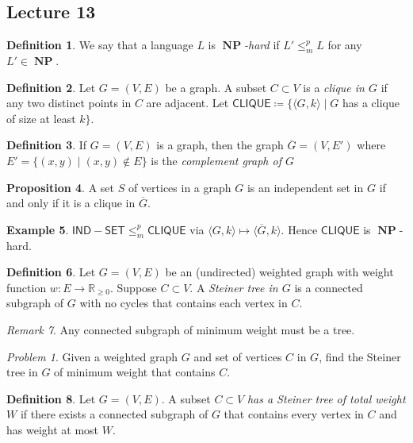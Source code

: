 \documentclass[10pt,letterpaper,cm]{nupset}
\theoremstyle{definition}
\newtheorem{definition}{Definition}[subsection]
\newtheorem{exmp}[definition]{Example}
\theoremstyle{theorem}
\newtheorem{prop}[definition]{Proposition}
\theoremstyle{remark}
\newtheorem{remark}[definition]{Remark}
\newtheorem*{prob}{Problem}
\newcommand{\R}{\mathbb R}
\newcommand{\1}{\mathbf{1}}
\newcommand{\0}{\vec 0}
\DeclareMathOperator{\NP}{\mathbf{NP}}
\begin{document}
\subsection{Lecture 13}

\begin{definition}
We say that a language $L$ is \textit{$\NP$-hard} if $L' \leq_m^p L$ for any $L' \in \NP$.
\end{definition}

\begin{definition}
Let $G=(V,E)$ be a graph. A subset $C \subset V$ is a \textit{clique in $G$} if any two distinct points in $C$ are adjacent. Let $\mathsf{CLIQUE}\coloneqq \{\langle G, k \rangle \mid G$ has a clique of size at least $k\}$.
\end{definition}

\begin{definition}
If $G= (V,E)$ is a graph, then the graph $\overline{G} = (V, E')$ where $E' = \{(x,y) \mid (x,y) \notin E\}$ is the  \textit{complement graph of $G$} 
\end{definition}

\begin{prop}
 A set $S$ of vertices in a graph $G$ is an independent set in $G$ if and only if it is a clique in $\overline{G}$.
\end{prop}

\begin{exmp}
$\mathsf{IND{-}SET} \leq_m^p \mathsf{CLIQUE}$ via $\langle G, k \rangle \mapsto \langle \overline{G}, k \rangle$. Hence $\mathsf{CLIQUE}$ is $\NP$-hard.
\end{exmp}

\begin{definition}
Let $G= (V,E)$ be an (undirected) weighted graph with weight function $w : E \to \R_{\geq 0}$. Suppose $C \subset V$. A \textit{Steiner tree in $G$} is a connected subgraph of $G$ with no cycles that contains each vertex in $C$.
\end{definition}

\begin{remark}
Any connected subgraph of minimum weight must be a tree.
\end{remark}

\begin{prob}
Given a weighted graph $G$ and set of vertices $C$ in $G$, find the Steiner tree in $G$ of minimum weight that contains $C$.
\end{prob}

\begin{definition}
Let $G= (V,E)$. A subset $C\subset V$ \textit{has a Steiner tree of total weight $W$} if there exists a connected subgraph of $G$ that contains every vertex in $C$ and has weight at most $W$.
\end{definition}
\end{document}
